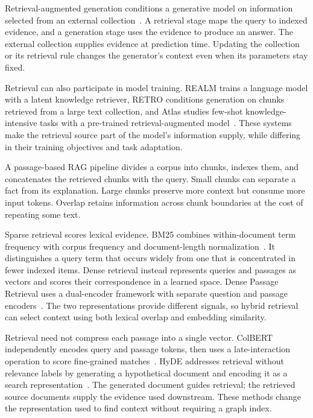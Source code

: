 Retrieval-augmented generation conditions a generative model on information selected from an external collection~\cite{bg-rag}. A retrieval stage maps the query to indexed evidence, and a generation stage uses the evidence to produce an answer. The external collection supplies evidence at prediction time. Updating the collection or its retrieval rule changes the generator's context even when its parameters stay fixed.

Retrieval can also participate in model training. REALM trains a language model with a latent knowledge retriever, RETRO conditions generation on chunks retrieved from a large text collection, and Atlas studies few-shot knowledge-intensive tasks with a pre-trained retrieval-augmented model~\cite{lit-guu2020retrieval,lit-borgeaud2022improving,lit-izacard2023atlas}. These systems make the retrieval source part of the model's information supply, while differing in their training objectives and task adaptation.

A passage-based RAG pipeline divides a corpus into chunks, indexes them, and concatenates the retrieved chunks with the query. Small chunks can separate a fact from its explanation. Large chunks preserve more context but consume more input tokens. Overlap retains information across chunk boundaries at the cost of repeating some text.

Sparse retrieval scores lexical evidence. BM25 combines within-document term frequency with corpus frequency and document-length normalization~\cite{bg-bm25}. It distinguishes a query term that occurs widely from one that is concentrated in fewer indexed items. Dense retrieval instead represents queries and passages as vectors and scores their correspondence in a learned space. Dense Passage Retrieval uses a dual-encoder framework with separate question and passage encoders~\cite{bg-dpr}. The two representations provide different signals, so hybrid retrieval can select context using both lexical overlap and embedding similarity.

Retrieval need not compress each passage into a single vector. ColBERT independently encodes query and passage tokens, then uses a late-interaction operation to score fine-grained matches~\cite{lit-khattab2020colbert}. HyDE addresses retrieval without relevance labels by generating a hypothetical document and encoding it as a search representation~\cite{lit-gao2023hyde}. The generated document guides retrieval; the retrieved source documents supply the evidence used downstream. These methods change the representation used to find context without requiring a graph index.


